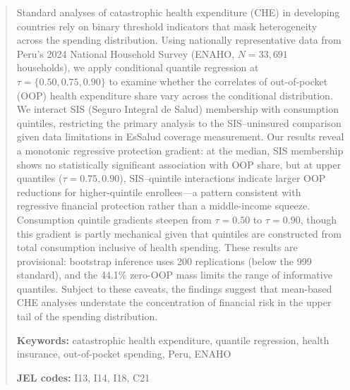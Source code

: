 \begin{abstract}
Standard analyses of catastrophic health expenditure (CHE) in developing countries rely on binary threshold indicators that mask heterogeneity across the spending distribution. Using nationally representative data from Peru's 2024 National Household Survey (ENAHO, $N = 33{,}691$ households), we apply conditional quantile regression at $\tau = \{0.50, 0.75, 0.90\}$ to examine whether the correlates of out-of-pocket (OOP) health expenditure share vary across the conditional distribution. We interact SIS (Seguro Integral de Salud) membership with consumption quintiles, restricting the primary analysis to the SIS--uninsured comparison given data limitations in EsSalud coverage measurement. Our results reveal a monotonic regressive protection gradient: at the median, SIS membership shows no statistically significant association with OOP share, but at upper quantiles ($\tau = 0.75, 0.90$), SIS--quintile interactions indicate larger OOP reductions for higher-quintile enrollees---a pattern consistent with regressive financial protection rather than a middle-income squeeze. Consumption quintile gradients steepen from $\tau = 0.50$ to $\tau = 0.90$, though this gradient is partly mechanical given that quintiles are constructed from total consumption inclusive of health spending. These results are provisional: bootstrap inference uses 200 replications (below the 999 standard), and the 44.1\% zero-OOP mass limits the range of informative quantiles. Subject to these caveats, the findings suggest that mean-based CHE analyses understate the concentration of financial risk in the upper tail of the spending distribution.

\medskip
\noindent \textbf{Keywords:} catastrophic health expenditure, quantile regression, health insurance, out-of-pocket spending, Peru, ENAHO

\noindent \textbf{JEL codes:} I13, I14, I18, C21
\end{abstract}

